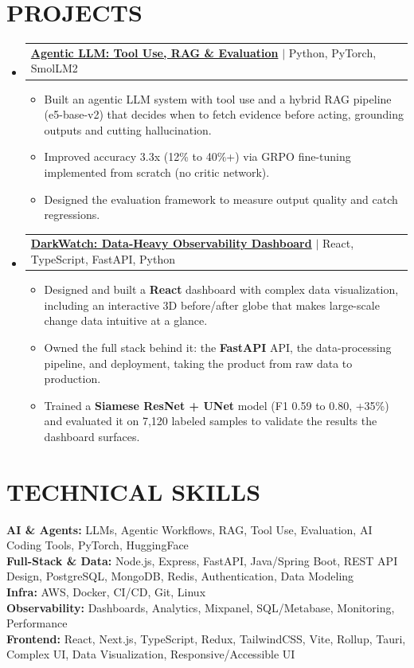 \documentclass[letterpaper,11pt]{article}
\makeatletter
\newcommand{\resumeItem}[1]{\item\small{{#1 \vspace{-3pt}}}}
\newcommand{\resumeProjectHeading}[2]{\item\begin{tabular*}{1.001\textwidth}{l@{\extracolsep{\fill}}r}\small#1 & \textbf{\small #2}\\ \end{tabular*}\vspace{-7pt}}
\newcommand{\resumeSubHeadingListStart}{\begin{itemize}[leftmargin=0.0in, label={}]}
\newcommand{\resumeSubHeadingListEnd}{\end{itemize}}
\newcommand{\resumeItemListStart}{\begin{itemize}}
\newcommand{\resumeItemListEnd}{\end{itemize}\vspace{-6pt}}
\makeatother
\begin{document}
\section{PROJECTS}
    \resumeSubHeadingListStart
        \resumeProjectHeading
        {\textbf{\large{\underline{Agentic LLM: Tool Use, RAG \& Evaluation}}} $|$ \small{Python, PyTorch, SmolLM2}}{}
        \resumeItemListStart
            \resumeItem{Built an agentic LLM system with tool use and a hybrid RAG pipeline (e5-base-v2) that decides when to fetch evidence before acting, grounding outputs and cutting hallucination.}
            \resumeItem{Improved accuracy 3.3x (12\% to 40\%+) via GRPO fine-tuning implemented from scratch (no critic network).}
            \resumeItem{Designed the evaluation framework to measure output quality and catch regressions.}
        \resumeItemListEnd
        \vspace{-13pt}
        \resumeProjectHeading
        {\textbf{\large{\underline{DarkWatch: Data-Heavy Observability Dashboard}}} $|$ \small{React, TypeScript, FastAPI, Python}}{}
        \resumeItemListStart
            \resumeItem{Designed and built a \textbf{React} dashboard with complex data visualization, including an interactive 3D before/after globe that makes large-scale change data intuitive at a glance.}
            \resumeItem{Owned the full stack behind it: the \textbf{FastAPI} API, the data-processing pipeline, and deployment, taking the product from raw data to production.}
            \resumeItem{Trained a \textbf{Siamese ResNet + UNet} model (F1 0.59 to 0.80, +35\%) and evaluated it on 7,120 labeled samples to validate the results the dashboard surfaces.}
        \resumeItemListEnd
    \resumeSubHeadingListEnd
\vspace{-5pt}
\section{TECHNICAL SKILLS}
\begin{itemize}[leftmargin=0.15in, label={}]
  \small{\item{
    \textbf{AI \& Agents:}{ LLMs, Agentic Workflows, RAG, Tool Use, Evaluation, AI Coding Tools, PyTorch, HuggingFace} \\
    \textbf{Full-Stack \& Data:}{ Node.js, Express, FastAPI, Java/Spring Boot, REST API Design, PostgreSQL, MongoDB, Redis, Authentication, Data Modeling} \\
    \textbf{Infra:}{ AWS, Docker, CI/CD, Git, Linux} \\
    \textbf{Observability:}{ Dashboards, Analytics, Mixpanel, SQL/Metabase, Monitoring, Performance} \\
    \textbf{Frontend:}{ React, Next.js, TypeScript, Redux, TailwindCSS, Vite, Rollup, Tauri, Complex UI, Data Visualization, Responsive/Accessible UI} \\
  }}
\end{itemize}
\end{document}

